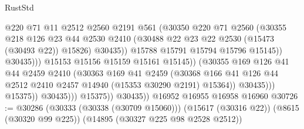 \begin{lexlean}{RustStd}
\begin{coremodule}
                                        @220
                                        @71
                                        @11
                                        @2512
                                        @2560
                                        @2191
                                        @561
                                        (@30350
                                          @220
                                          @71
                                          @2560
                                          (@30355
                                            @218
                                            @126
                                            @23
                                            @44
                                            @2530
                                            @2410
                                            (@30488 @22 @23 @22 @2530 (@15473 (@30493 @22)) @15826)
                                            @30435))
                                        @15788
                                        @15791
                                        @15794
                                        @15796
                                        @15145))
                                    @30435)))
                              @15153
                              @15156
                              @15159
                              @15161
                              @15145))
                          (@30355
                            @169
                            @126
                            @41
                            @44
                            @2459
                            @2410
                            (@30363
                              @169
                              @41
                              @2459
                              (@30368
                                @166
                                @41
                                @126
                                @44
                                @2512
                                @2410
                                @2457
                                @14940
                                (@15353 @30290 @2191)
                                @15364))
                            @30435)))
                      @15375))
                  @30435)))
            @15375))
        @30435))
    @16952
    @16955
    @16958
    @16960
@30726 := @30286
    (@30333 (@30338 (@30709 @15060)))
    (@15617 (@30316 @22))
    (@8615 (@30320 @99 @225))
    (@14895 (@30327 @225 @98 @2528 @2512))

\end{coremodule}
\end{lexlean}
